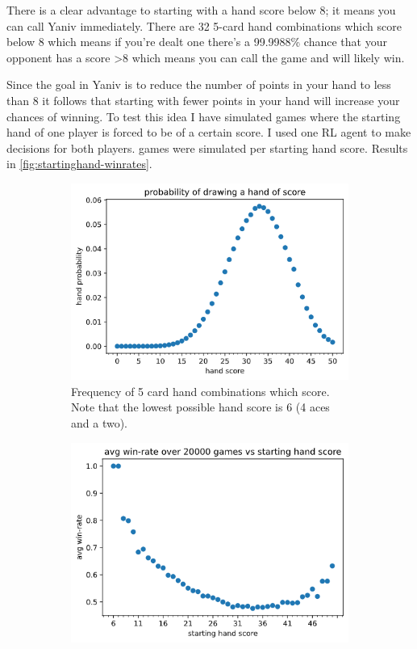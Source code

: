 \documentclass[../main.tex]{subfiles}
\begin{document}
There is a clear advantage to starting with a hand score below 8; it means you can call Yaniv immediately. There are 32 5-card hand combinations which score below 8 which means if you're dealt one there's a 99.9988\% chance that  your opponent has a score >8 which means you can call the game and will likely win. 

Since the goal in Yaniv is to reduce the number of points in your hand to less than 8 it follows that starting with fewer points in your hand will increase your chances of winning. To test this idea I have simulated games where the starting hand of one player is forced to be of a certain score. I used one RL agent to make decisions for both players.  games were simulated per starting hand score. Results in \autoref{fig:startinghand-winrates}.

\begin{figure}
    \centering
    \begin{subfigure}[t]{0.49\textwidth}
        \centering
        \includegraphics[width=\textwidth,keepaspectratio]{images/results/handscores.png}
        \caption{Frequency of 5 card hand combinations which score. Note that the lowest possible hand score is 6 (4 aces and a two).}
        \label{fig:startinghand-probs}
    \end{subfigure}
    \hfill
    \begin{subfigure}[t]{0.49\textwidth}
        \centering
        \includegraphics[width=\textwidth,keepaspectratio]{images/results/winrate_handscore.png}

\end{subfigure}
\end{figure}
\end{document}
